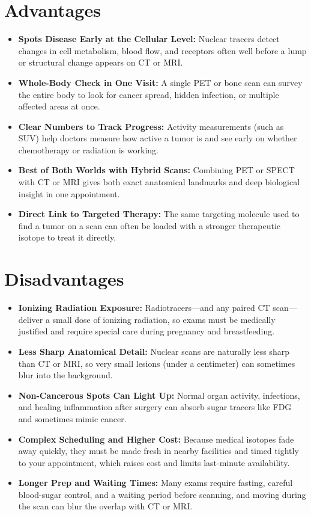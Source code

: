 \section{Advantages}
\begin{itemize}
  \item \textbf{Spots Disease Early at the Cellular Level:} Nuclear tracers detect changes in cell metabolism, blood flow, and receptors often well before a lump or structural change appears on CT or MRI.
  \item \textbf{Whole-Body Check in One Visit:} A single PET or bone scan can survey the entire body to look for cancer spread, hidden infection, or multiple affected areas at once.
  \item \textbf{Clear Numbers to Track Progress:} Activity measurements (such as SUV) help doctors measure how active a tumor is and see early on whether chemotherapy or radiation is working.
  \item \textbf{Best of Both Worlds with Hybrid Scans:} Combining PET or SPECT with CT or MRI gives both exact anatomical landmarks and deep biological insight in one appointment.
  \item \textbf{Direct Link to Targeted Therapy:} The same targeting molecule used to find a tumor on a scan can often be loaded with a stronger therapeutic isotope to treat it directly.
\end{itemize}

\section{Disadvantages}
\begin{itemize}
  \item \textbf{Ionizing Radiation Exposure:} Radiotracers---and any paired CT scan---deliver a small dose of ionizing radiation, so exams must be medically justified and require special care during pregnancy and breastfeeding.
  \item \textbf{Less Sharp Anatomical Detail:} Nuclear scans are naturally less sharp than CT or MRI, so very small lesions (under a centimeter) can sometimes blur into the background.
  \item \textbf{Non-Cancerous Spots Can Light Up:} Normal organ activity, infections, and healing inflammation after surgery can absorb sugar tracers like FDG and sometimes mimic cancer.
  \item \textbf{Complex Scheduling and Higher Cost:} Because medical isotopes fade away quickly, they must be made fresh in nearby facilities and timed tightly to your appointment, which raises cost and limits last-minute availability.
  \item \textbf{Longer Prep and Waiting Times:} Many exams require fasting, careful blood-sugar control, and a waiting period before scanning, and moving during the scan can blur the overlap with CT or MRI.
\end{itemize}


